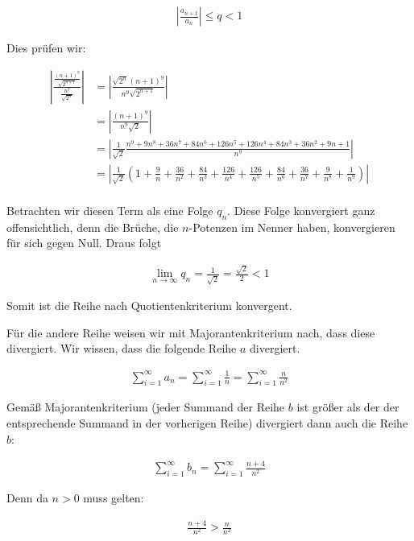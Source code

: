 \documentclass[a4paper,german,12pt,smallheadings]{scrartcl}
\begin{document}
\begin{align*}
  \left| \frac{a_{n+1}}{a_n} \right| \le q < 1
\end{align*}

Dies prüfen wir:

\begin{align*}
  \left| \frac{\frac{(n+1)^9}{\sqrt{2^{n+1}}}}{\frac{n^9}{\sqrt{2^n}}} \right| &= \left| \frac{\sqrt{2^n} (n+1)^9}{n^9 \sqrt{2^{n+1}}} \right| \\
  &= \left| \frac{(n+1)^9}{n^9 \sqrt{2}} \right| \\
  &= \left| \frac{1}{\sqrt{2}} \frac{n^9+9n^8+36n^7+84n^6+126n^5+126n^4+84n^3+36n^2+9n+1}{n^9} \right| \\
  &= \left| \frac{1}{\sqrt{2}} \left(1 + \frac{9}{n} + \frac{36}{n^2} + \frac{84}{n^3} + \frac{126}{n^4} + \frac{126}{n^5} + \frac{84}{n^6} + \frac{36}{n^7} + \frac{9}{n^8} + \frac{1}{n^9}\right) \right| \\
\end{align*}

Betrachten wir diesen Term als eine Folge $q_n$. Diese Folge konvergiert ganz
offensichtlich, denn die Brüche, die $n$-Potenzen im Nenner haben, konvergieren
für sich gegen Null. Draus folgt

\begin{align*}
  \lim_{n \to \infty} q_n = \frac{1}{\sqrt{2}} = \frac{\sqrt{2}}{2} < 1
\end{align*}

Somit ist die Reihe nach Quotientenkriterium konvergent.

Für die andere Reihe weisen wir mit Majorantenkriterium nach, dass diese divergiert. Wir wissen, dass die folgende Reihe $a$ divergiert.

\begin{align*}
  \sum_{i=1}^\infty a_n = \sum_{i=1}^\infty  \frac{1}{n} = \sum_{i=1}^\infty \frac{n}{n^2}
\end{align*}

Gemäß Majorantenkriterium (jeder Summand der Reihe $b$ ist größer als der der
entsprechende Summand in der vorherigen Reihe) divergiert dann auch die Reihe $b$:

\begin{align*}
  \sum_{i=1}^\infty b_n = \sum_{i=1}^\infty  \frac{n+4}{n^2}
\end{align*}

Denn da $n>0$ muss gelten:

\begin{align*}
  \frac{n+4}{n^2} > \frac{n}{n^2}
\end{align*}
\end{document}
